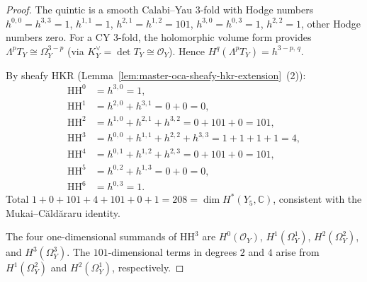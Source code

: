 \begin{proof}
The quintic is a smooth Calabi--Yau $3$-fold with Hodge numbers
$h^{0, 0} = h^{3, 3} = 1$, $h^{1, 1} = 1$, $h^{2, 1} = h^{1, 2} = 101$,
$h^{3, 0} = h^{0, 3} = 1$, $h^{2, 2} = 1$, other Hodge numbers zero.
For a CY $3$-fold, the holomorphic volume form provides
$\Lambda^p T_Y \cong \Omega^{3-p}_Y$ \textup{(}via
$K_Y^\vee = \det T_Y \cong \mathcal O_Y$\textup{).} Hence
$H^q(\Lambda^p T_Y) = h^{3 - p,\, q}$.

By sheafy HKR
\textup{(}Lemma~\ref{lem:master-oca-sheafy-hkr-extension}~\textup{(2)}\textup{)}:
\begin{align*}
\mathrm{HH}^0 &= h^{3, 0} = 1,\\
\mathrm{HH}^1 &= h^{2, 0} + h^{3, 1} = 0 + 0 = 0,\\
\mathrm{HH}^2 &= h^{1, 0} + h^{2, 1} + h^{3, 2} = 0 + 101 + 0 = 101,\\
\mathrm{HH}^3 &= h^{0, 0} + h^{1, 1} + h^{2, 2} + h^{3, 3}
               = 1 + 1 + 1 + 1 = 4,\\
\mathrm{HH}^4 &= h^{0, 1} + h^{1, 2} + h^{2, 3} = 0 + 101 + 0 = 101,\\
\mathrm{HH}^5 &= h^{0, 2} + h^{1, 3} = 0 + 0 = 0,\\
\mathrm{HH}^6 &= h^{0, 3} = 1.
\end{align*}
Total $1 + 0 + 101 + 4 + 101 + 0 + 1 = 208 = \dim H^*(Y_5, \mathbb C)$,
consistent with the Mukai--C{\u a}ld{\u a}raru identity.

The four one-dimensional summands of $\mathrm{HH}^3$ are
$H^0(\mathcal O_Y)$, $H^1(\Omega_Y^1)$,
$H^2(\Omega_Y^2)$, and $H^3(\Omega_Y^3)$.  The
$101$-dimensional terms in degrees $2$ and $4$ arise from
$H^1(\Omega_Y^2)$ and $H^2(\Omega_Y^1)$, respectively.
\end{proof}



